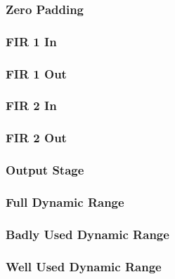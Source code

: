 \begin{frame}
    \frametitle{Zero Padding}

    \centering
    
    
\end{frame}

\begin{frame}
    \frametitle{FIR 1 In}

    \centering
    
    
\end{frame}

\begin{frame}
    \frametitle{FIR 1 Out}

    \centering
    
    
\end{frame}

\begin{frame}
    \frametitle{FIR 2 In}

    \centering
    
    
\end{frame}

\begin{frame}
    \frametitle{FIR 2 Out}

    \centering
    
    
\end{frame}

\begin{frame}
    \frametitle{Output Stage}

    \centering
    
    
\end{frame}

\begin{frame}
    \frametitle{Full Dynamic Range}

    \centering
    
    
\end{frame}

\begin{frame}
    \frametitle{Badly Used Dynamic Range}

    \centering
    
    
\end{frame}

\begin{frame}
    \frametitle{Well Used Dynamic Range}

    \centering
    
    
\end{frame}
